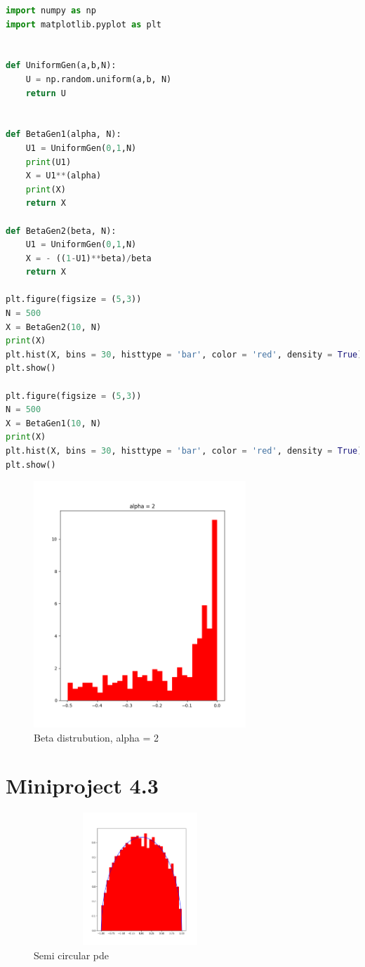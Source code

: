 \documentclass[a4paper]{article}
\begin{document}
\begin{lstlisting}[language=Python]
import numpy as np 
import matplotlib.pyplot as plt 


def UniformGen(a,b,N):
    U = np.random.uniform(a,b, N) 
    return U


def BetaGen1(alpha, N):
	U1 = UniformGen(0,1,N) 
	print(U1)
	X = U1**(alpha) 
	print(X)
	return X

def BetaGen2(beta, N):
	U1 = UniformGen(0,1,N) 
	X = - ((1-U1)**beta)/beta
	return X

plt.figure(figsize = (5,3)) 
N = 500
X = BetaGen2(10, N)
print(X)
plt.hist(X, bins = 30, histtype = 'bar', color = 'red', density = True) 
plt.show()

plt.figure(figsize = (5,3)) 
N = 500
X = BetaGen1(10, N)
print(X)
plt.hist(X, bins = 30, histtype = 'bar', color = 'red', density = True) 
plt.show()
\end{lstlisting}


\begin{figure}[ht!]
\centering
\includegraphics[width=80mm]{4_5.png}
\caption{Beta distrubution, alpha = 2}
\label{fig:example}
\end{figure}


\section*{Miniproject 4.3}

\begin{figure}[ht!]
\centering
\includegraphics[width=80mm, height=50mm]{4_3.png}
\caption{Semi circular pde}
\label{fig:example}
\end{figure}
\end{document}
